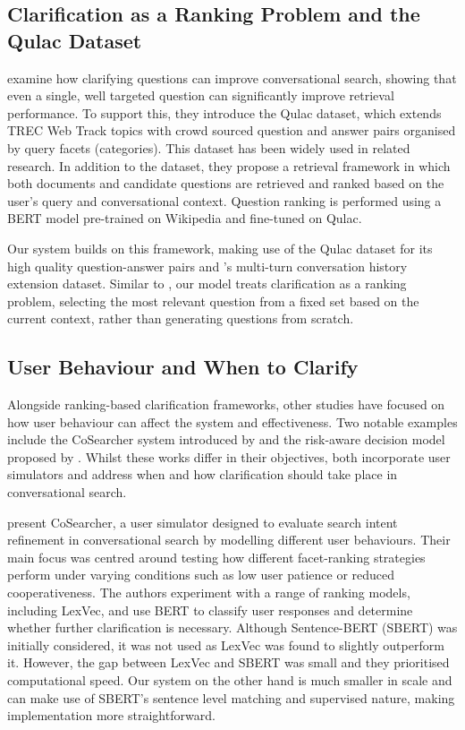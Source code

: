 \documentclass[11pt]{article}
\begin{document}
\subsection{Clarification as a Ranking Problem and the Qulac Dataset}
\citet{Aliannejadi2019} examine how clarifying questions can improve conversational search, showing that even a single, well targeted question can significantly improve retrieval performance. To support this, they introduce the Qulac dataset, which extends TREC Web Track topics with crowd sourced question and answer pairs organised by query facets (categories). This dataset has been widely used in related research. In addition to the dataset, they propose a retrieval framework in which both documents and candidate questions are retrieved and ranked based on the user's query and conversational context. Question ranking is performed using a BERT model pre-trained on Wikipedia and fine-tuned on Qulac.

Our system builds on this framework, making use of the Qulac dataset for its high quality question-answer pairs and \citeauthor{Aliannejadi2019}'s multi-turn conversation history extension dataset. Similar to \citeauthor{Aliannejadi2019}, our model treats clarification as a ranking problem, selecting the most relevant question from a fixed set based on the current context, rather than generating questions from scratch.

\subsection{User Behaviour and When to Clarify}
Alongside ranking-based clarification frameworks, other studies have focused on how user behaviour can affect the system and effectiveness. Two notable examples include the CoSearcher system introduced by \citet{Salle2022} and the risk-aware decision model proposed by \citet{Wang2022}. Whilst these works differ in their objectives, both incorporate user simulators and address when and how clarification should take place in conversational search.

\citet{Salle2022} present CoSearcher, a user simulator designed to evaluate search intent refinement in conversational search by modelling different user behaviours. Their main focus was centred around testing how different facet-ranking strategies perform under varying conditions such as low user patience or reduced cooperativeness. The authors experiment with a range of ranking models, including LexVec, and use BERT to classify user responses and determine whether further clarification is necessary. Although Sentence-BERT (SBERT) was initially considered, it was not used as LexVec was found to slightly outperform it. However, the gap between LexVec and SBERT was small and they prioritised computational speed. Our system on the other hand is much smaller in scale and can make use of SBERT's sentence level matching and supervised nature, making implementation more straightforward.
\end{document}
